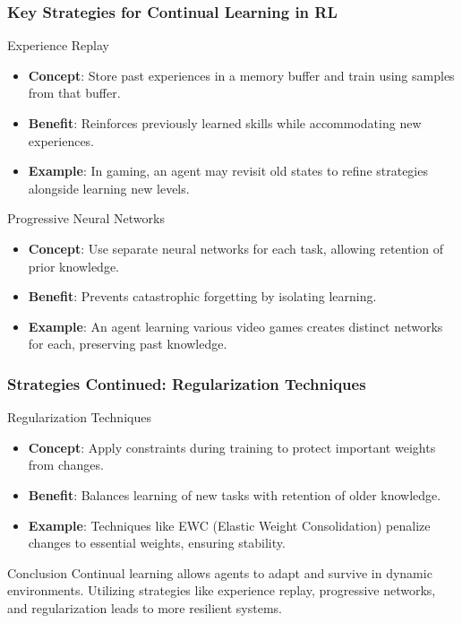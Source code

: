 \documentclass[aspectratio=169]{beamer}
\begin{document}
\begin{frame}[fragile]
    \frametitle{Key Strategies for Continual Learning in RL}
    \begin{block}{Experience Replay}
        \begin{itemize}
            \item \textbf{Concept}: Store past experiences in a memory buffer and train using samples from that buffer.
            \item \textbf{Benefit}: Reinforces previously learned skills while accommodating new experiences.
            \item \textbf{Example}: In gaming, an agent may revisit old states to refine strategies alongside learning new levels.
        \end{itemize}
    \end{block}

    \begin{block}{Progressive Neural Networks}
        \begin{itemize}
            \item \textbf{Concept}: Use separate neural networks for each task, allowing retention of prior knowledge.
            \item \textbf{Benefit}: Prevents catastrophic forgetting by isolating learning.
            \item \textbf{Example}: An agent learning various video games creates distinct networks for each, preserving past knowledge.
        \end{itemize}
    \end{block}
\end{frame}

\begin{frame}[fragile]
    \frametitle{Strategies Continued: Regularization Techniques}
    \begin{block}{Regularization Techniques}
        \begin{itemize}
            \item \textbf{Concept}: Apply constraints during training to protect important weights from changes.
            \item \textbf{Benefit}: Balances learning of new tasks with retention of older knowledge.
            \item \textbf{Example}: Techniques like EWC (Elastic Weight Consolidation) penalize changes to essential weights, ensuring stability.
        \end{itemize}
    \end{block}

    \begin{block}{Conclusion}
        Continual learning allows agents to adapt and survive in dynamic environments. Utilizing strategies like experience replay, progressive networks, and regularization leads to more resilient systems.
    \end{block}
\end{frame}
\end{document}
